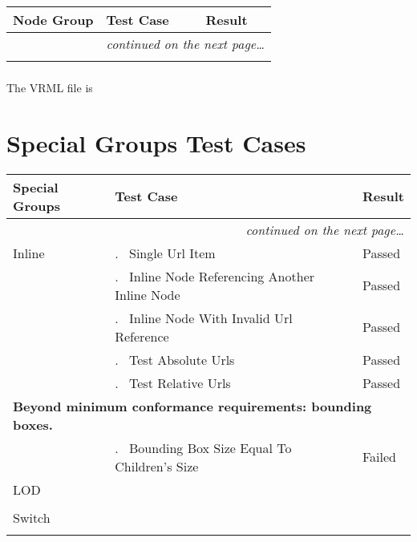 \documentclass[12pt,letterpaper]{article}
\newcounter{testCaseCtr}
\newcommand{\testCase}{\arabic{testCaseCtr}.~ \stepcounter{testCaseCtr}}
\newcommand{\resetTestCase}{\setcounter{testCaseCtr}{1}}
\newcommand{\SpGrA}{Single Url Item}
\newcommand{\SpGrB}{Inline Node Referencing Another Inline Node}
\newcommand{\SpGrC}{Inline Node With Invalid Url Reference}
\newcommand{\SpGrD}{Test Absolute Urls}
\newcommand{\SpGrE}{Test Relative Urls}
\newcommand{\SpGrF}{Bounding Box Size Equal To Children's Size}
\begin{document}
\begin{center}
\setlongtables
\begin{longtable}{|l|l|l|}
\hline
\textbf{Node Group} & \textbf{Test Case} & \textbf{Result} \\
\hline\hline
\endhead
\cline{2-3}
 & \multicolumn{2}{|r|}{\textsl{continued on the next page\ldots}} \\
\hline
\endfoot
\hline
\endlastfoot
& & \\
\cline{2-3}
\end{longtable}
\end{center}

\subsubsection{}
The VRML file is 

\section{Special Groups Test Cases}
\resetTestCase

\begin{center}
\setlongtables
\begin{longtable}{|l|l|l|}
\hline
\textbf{Special Groups} & \textbf{Test Case} & \textbf{Result} \\
\hline\hline
\endhead
\cline{2-3}
 & \multicolumn{2}{|r|}{\textsl{continued on the next page\ldots}} \\
\hline
\endfoot
\hline
\endlastfoot
Inline & \testCase \SpGrA & Passed \\\cline{2-3}
& \testCase \SpGrB & Passed \\\cline{2-3}
& \testCase \SpGrC & Passed \\\cline{2-3}
& \testCase \SpGrD & Passed \\\cline{2-3}
& \testCase \SpGrE & Passed \\\hline
\multicolumn{3}{|l|}{\textbf{Beyond minimum conformance requirements:
bounding boxes.}} \\\hline
& \testCase \SpGrF & Failed \\\hline
\resetTestCase
LOD & & \\\cline{2-3}
& & \\\hline
\resetTestCase
Switch & & \\\cline{2-3}
& & \\
\end{longtable}
\end{center}
\end{document}

